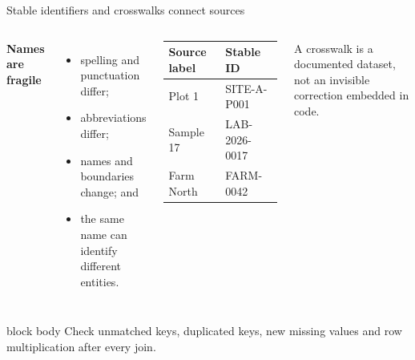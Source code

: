 \documentclass[10pt,aspectratio=169]{beamer}
\begin{document}
\begin{frame}{Stable identifiers and crosswalks connect sources}

\small

\begin{columns}[T]


\textbf{Names are fragile}

\begin{itemize}
  \item spelling and punctuation differ;
  \item abbreviations differ;
  \item names and boundaries change; and
  \item the same name can identify different entities.
\end{itemize}


\begin{tabularx}{\textwidth}{XX}
\toprule
\textbf{Source label} & \textbf{Stable ID} \\
\midrule
Plot 1 & SITE-A-P001 \\
Sample 17 & LAB-2026-0017 \\
Farm North & FARM-0042 \\
\bottomrule
\end{tabularx}

\vspace{0.35cm}

A crosswalk is a documented dataset, not an invisible correction embedded in code.

\end{columns}

\vspace{0.30cm}

\begin{beamercolorbox}[rounded=true,sep=8pt]{block body}
Check unmatched keys, duplicated keys, new missing values and row multiplication after every join.
\end{beamercolorbox}

\end{frame}
\end{document}
